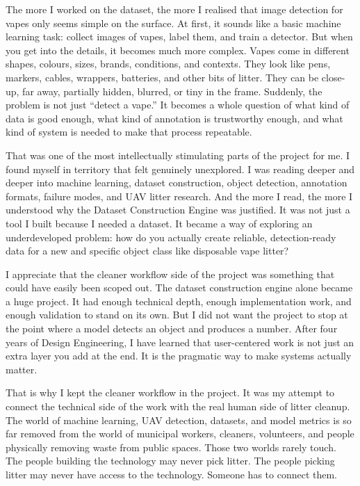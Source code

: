 The more I worked on the dataset, the more I realised that image detection for vapes only seems simple on the surface. At first, it sounds like a basic machine learning task: collect images of vapes, label them, and train a detector. But when you get into the details, it becomes much more complex. Vapes come in different shapes, colours, sizes, brands, conditions, and contexts. They look like pens, markers, cables, wrappers, batteries, and other bits of litter. They can be close-up, far away, partially hidden, blurred, or tiny in the frame. Suddenly, the problem is not just ``detect a vape.'' It becomes a whole question of what kind of data is good enough, what kind of annotation is trustworthy enough, and what kind of system is needed to make that process repeatable.

That was one of the most intellectually stimulating parts of the project for me. I found myself in territory that felt genuinely unexplored. I was reading deeper and deeper into machine learning, dataset construction, object detection, annotation formats, failure modes, and UAV litter research. And the more I read, the more I understood why the Dataset Construction Engine was justified. It was not just a tool I built because I needed a dataset. It became a way of exploring an underdeveloped problem: how do you actually create reliable, detection-ready data for a new and specific object class like disposable vape litter?

I appreciate that the cleaner workflow side of the project was something that could have easily been scoped out. The dataset construction engine alone became a huge project. It had enough technical depth, enough implementation work, and enough validation to stand on its own. But I did not want the project to stop at the point where a model detects an object and produces a number. After four years of Design Engineering, I have learned that user-centered work is not just an extra layer you add at the end. It is the pragmatic way to make systems actually matter.

That is why I kept the cleaner workflow in the project. It was my attempt to connect the technical side of the work with the real human side of litter cleanup. The world of machine learning, UAV detection, datasets, and model metrics is so far removed from the world of municipal workers, cleaners, volunteers, and people physically removing waste from public spaces. Those two worlds rarely touch. The people building the technology may never pick litter. The people picking litter may never have access to the technology. Someone has to connect them.

